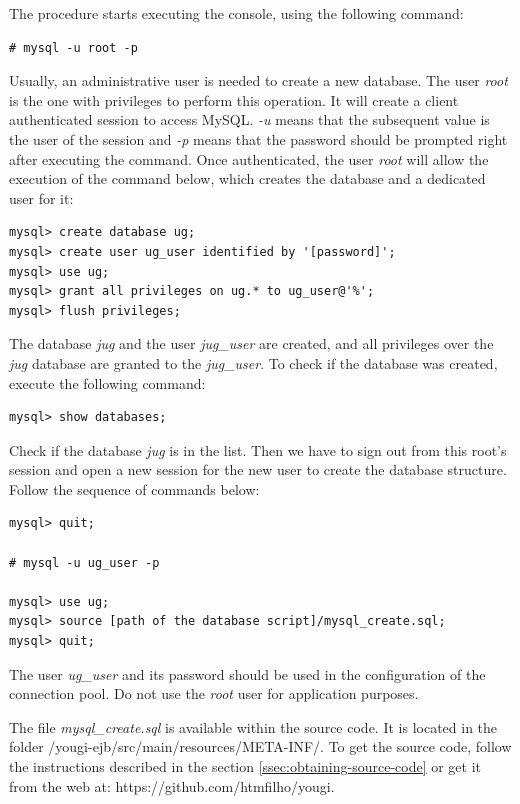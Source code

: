 \documentclass[envcountsame,envcountchap]{svmono}
\begin{document}
The procedure starts executing the console, using the following command:

\begin{verbatim}
# mysql -u root -p
\end{verbatim}

Usually, an administrative user is needed to create a new database. The user \textit{root} is the one with privileges to perform this operation. It will create a client authenticated session to access MySQL. \textit{-u} means that the subsequent value is the user of the session and \textit{-p} means that the password should be prompted right after executing the command. Once authenticated, the user \textit{root} will allow the execution of the command below, which creates the database and a dedicated user for it:

\begin{verbatim}
mysql> create database ug;
mysql> create user ug_user identified by '[password]';
mysql> use ug;
mysql> grant all privileges on ug.* to ug_user@'%';
mysql> flush privileges;
\end{verbatim}

The database \textit{jug} and the user \textit{jug\_user} are created, and all privileges over the \textit{jug} database are granted to the \textit{jug\_user}. To check if the database was created, execute the following command:

\begin{verbatim}
mysql> show databases;
\end{verbatim}

Check if the database \textit{jug} is in the list. Then we have to sign out from this root's session and open a new session for the new user to create the database structure. Follow the sequence of commands below:

\begin{verbatim}
mysql> quit;

# mysql -u ug_user -p

mysql> use ug;
mysql> source [path of the database script]/mysql_create.sql;
mysql> quit;
\end{verbatim}

The user \textit{ug\_user} and its password should be used in the configuration of the connection pool. Do not use the \textit{root} user for application purposes.

The file \textit{mysql\_create.sql} is available within the source code. It is located in the folder /yougi-ejb/src/main/resources/META-INF/. To get the source code, follow the instructions described in the section \ref{ssec:obtaining-source-code} or get it from the web at: https://github.com/htmfilho/yougi.
\end{document}
